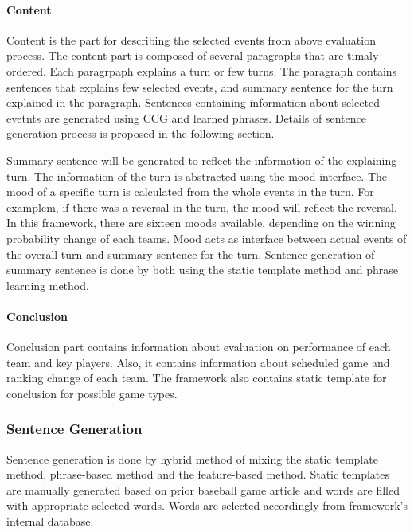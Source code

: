 \documentclass[11pt,letterpaper]{article}
\begin{document}
\paragraph{Content} 

Content is the part for describing the selected events from above evaluation process. The content part is composed of several paragraphs that are timaly ordered. Each paragrpaph explains a turn or few turns. The paragraph contains sentences that explains few selected events, and summary sentence for the turn explained in the paragraph. Sentences containing information about selected evetnts are generated using CCG and learned phrases. Details of sentence generation process is proposed in the following section. 

Summary sentence will be generated to reflect the information of the explaining turn. The information of the turn is abstracted using the mood interface. The mood of a specific turn is calculated from the whole events in the turn. For examplem, if there was a reversal in the turn, the mood will reflect the reversal. In this framework, there are sixteen moods available, depending on the winning probability change of each teams. Mood acts as interface between actual events of the overall turn and summary sentence for the turn. Sentence generation of summary sentence is done by both using the static template method and phrase learning method. 

\paragraph{Conclusion} 

Conclusion part contains information about evaluation on performance of each team and key players. Also, it contains information about scheduled game and ranking change of each team. The framework also contains static template for conclusion for possible game types. 

\subsubsection{Sentence Generation} 

Sentence generation is done by hybrid method of mixing the static template method, phrase-based method and the feature-based method. Static templates are manually generated based on prior baseball game article and words are filled with appropriate selected words. Words are selected accordingly from framework's internal database. 
\end{document}
